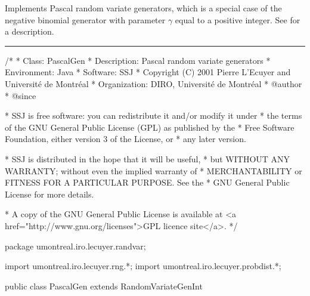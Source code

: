 
Implements Pascal random variate generators, which is a special case of the
negative binomial generator with parameter $\gamma$ equal to a positive integer.
See  for a description.


\bigskip\hrule

\begin{code}
\begin{hide}
/*
 * Class:        PascalGen
 * Description:  Pascal random variate generators
 * Environment:  Java
 * Software:     SSJ 
 * Copyright (C) 2001  Pierre L'Ecuyer and Université de Montréal
 * Organization: DIRO, Université de Montréal
 * @author       
 * @since

 * SSJ is free software: you can redistribute it and/or modify it under
 * the terms of the GNU General Public License (GPL) as published by the
 * Free Software Foundation, either version 3 of the License, or
 * any later version.

 * SSJ is distributed in the hope that it will be useful,
 * but WITHOUT ANY WARRANTY; without even the implied warranty of
 * MERCHANTABILITY or FITNESS FOR A PARTICULAR PURPOSE.  See the
 * GNU General Public License for more details.

 * A copy of the GNU General Public License is available at
   <a href="http://www.gnu.org/licenses">GPL licence site</a>.
 */
\end{hide}
package umontreal.iro.lecuyer.randvar;\begin{hide}
import umontreal.iro.lecuyer.rng.*;
import umontreal.iro.lecuyer.probdist.*;
\end{hide}

public class PascalGen extends RandomVariateGenInt \begin{hide} {
   protected int    n;
   protected double p;    
\end{hide}
\end{code}

